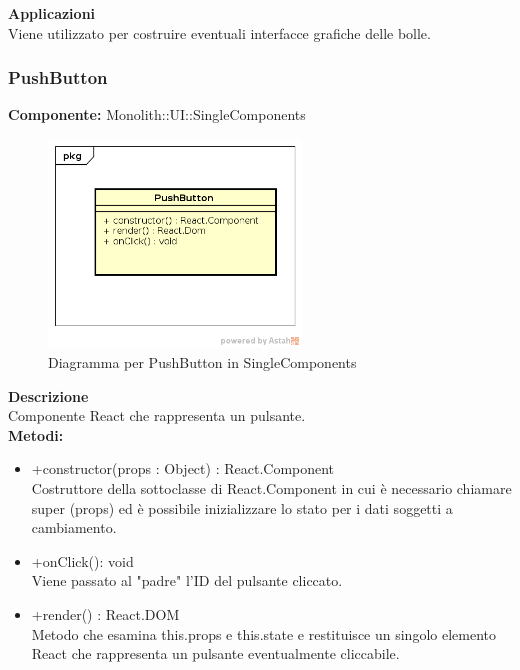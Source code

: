 \textbf{Applicazioni}\\
Viene utilizzato per costruire eventuali interfacce grafiche delle bolle. \\ 


\clearpage

\subsubsection{PushButton}
\textbf{Componente:}  Monolith::UI::SingleComponents\\
   \FloatBarrier
   \begin{figure}[ht]
   \centering
   \includegraphics[width=0.6\textwidth]{img/single-PushButton.png}
   \caption{{Diagramma per PushButton in SingleComponents}}
\end{figure}
\FloatBarrier
\textbf{Descrizione}\\
Componente React che rappresenta un pulsante. \\
\textbf{Metodi:} 
\begin{itemize}
\item +constructor(props : Object) : React.Component 
\\
Costruttore della sottoclasse di React.Component in cui è necessario chiamare super (props) ed è possibile inizializzare lo stato per i dati soggetti a cambiamento.

\item +onClick(): void 
\\ 
Viene passato al "padre" l'ID del pulsante cliccato.

\item +render() : React.DOM 
\\
Metodo che esamina this.props e this.state e restituisce un singolo elemento React che rappresenta un pulsante eventualmente cliccabile.

\end{itemize}

